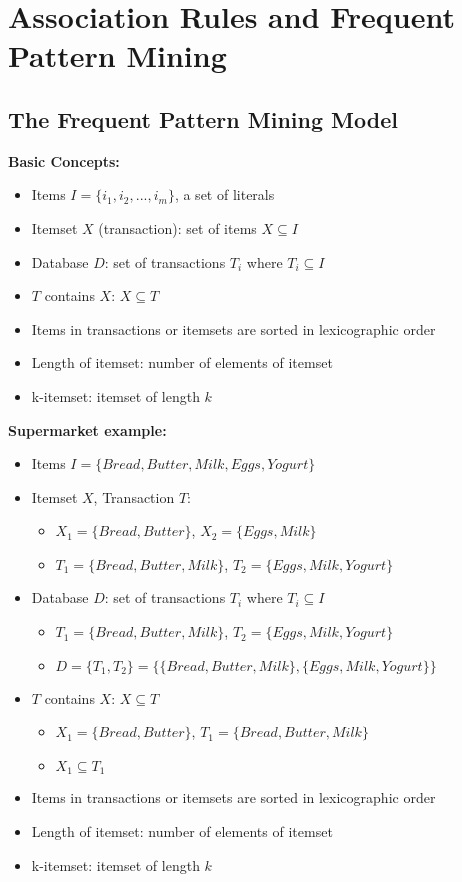 \documentclass[../notes.tex]{subfiles}
\begin{document}
\section{Association Rules and Frequent Pattern Mining}
\subsection{The Frequent Pattern Mining Model}
\textbf{Basic Concepts:}
\begin{itemize}
\item Items $I = \{i_1, i_2, ..., i_m\}$, a set of literals 
\item Itemset $X$ (transaction): set of items $X \subseteq I$
\item Database $D$: set of transactions $T_i$ where $T_i \subseteq I$
\item $T$ contains $X$: $X \subseteq T$
\item Items in transactions or itemsets are sorted in lexicographic order
\item Length of itemset: number of elements of itemset
\item k-itemset: itemset of length $k$
\end{itemize}

\textbf{Supermarket example:}
\begin{itemize}
  \item Items $I = \{Bread, Butter, Milk, Eggs, Yogurt\}$ 
  \item Itemset $X$, Transaction $T$: 
    \begin{itemize}
      \item $X_1 = \{Bread, Butter\}$, $X_2 = \{Eggs, Milk\}$
      \item $T_1 = \{Bread, Butter, Milk\}$, $T_2 = \{Eggs, Milk, Yogurt\}$
    \end{itemize}
  \item Database $D$: set of transactions $T_i$ where $T_i \subseteq I$
    \begin{itemize}
      \item $T_1 = \{Bread, Butter, Milk\}$, $T_2 = \{Eggs, Milk, Yogurt\}$
      \item $D = \{T_1, T_2\} = \{\{Bread, Butter, Milk\}, \{Eggs, Milk, Yogurt\}\}$
    \end{itemize}
  \item $T$ contains $X$: $X \subseteq T$
    \begin{itemize}
      \item $X_1 = \{Bread, Butter\}$, $T_1 = \{Bread, Butter, Milk\}$
      \item $X_1 \subseteq T_1$
    \end{itemize}
  \item Items in transactions or itemsets are sorted in lexicographic order
  \item Length of itemset: number of elements of itemset
  \item k-itemset: itemset of length $k$
\end{itemize}
\end{document}
